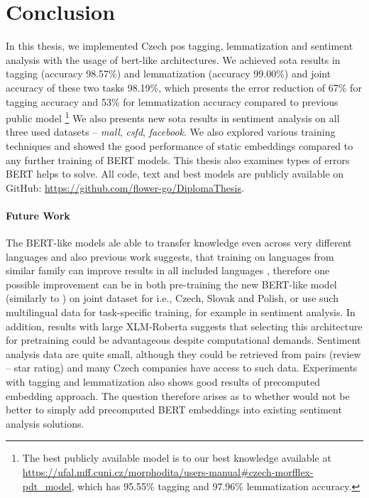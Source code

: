 \chapter*{Conclusion}
\label{chap:concl}
In this thesis, we implemented Czech \acrlong{pos} tagging, lemmatization and sentiment analysis with the usage of \acrlong{bert}-like architectures. We achieved \acrlong{sota} results in tagging (accuracy 98.57\%) and lemmatization (accuracy 99.00\%) and joint accuracy of these two tasks 98.19\%, which presents the error reduction of 67\% for tagging accuracy and 53\% for lemmatization accuracy compared to previous public model \citep{Strakova}\footnote{The best publicly available model is to our best knowledge available at \url{https://ufal.mff.cuni.cz/morphodita/users-manual\#czech-morfflex-pdt_model}, which has 95.55\% tagging and 97.96\% lemmatization accuracy.} We also presents new \acrlong{sota} results in sentiment analysis on all three used datasets -- \textit{mall}, \textit{csfd}, \textit{facebook}. We also explored various training techniques and showed the good performance of static embeddings compared to any further training of BERT models. This thesis also examines types of errors BERT helps to solve. All code, text and best models are publicly available on GitHub: \url{https://github.com/flower-go/DiplomaThesis}.

\subsubsection{Future Work}
The BERT-like models ale able to transfer knowledge even across very different languages and also previous work suggests, that training on languages from similar family can improve results in all included languages \citep{Arkhipov2019}, therefore one possible improvement can be in both pre-training the new BERT-like model (similarly to \citep{Straka2021}) on joint dataset for i.e., Czech, Slovak and Polish, or use such multilingual data for task-specific training, for example in sentiment analysis. In addition, results with large XLM-Roberta suggests that selecting this architecture for pretraining could be advantageous despite computational demands. Sentiment analysis data are quite small, although they could be retrieved from pairs (review -- star rating) and many Czech companies have access to such data. Experiments with tagging and lemmatization also shows good results of precomputed embedding approach. The question therefore arises as to whether would not be better to simply add precomputed BERT embeddings into existing sentiment analysis solutions.




